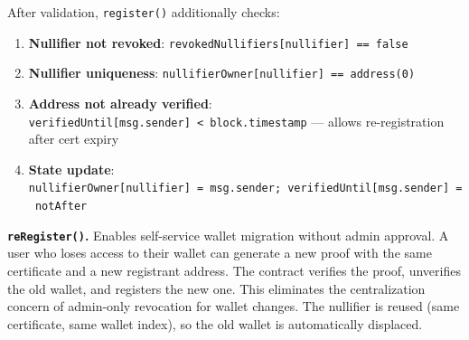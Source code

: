 \documentclass[11pt, a4paper]{article}
\providecommand{\tightlist}{%
  \setlength{\itemsep}{0pt}\setlength{\parskip}{0pt}}
\begin{document}
After validation, \texttt{register()} additionally checks:

\begin{enumerate}
\def\labelenumi{\arabic{enumi}.}
\setcounter{enumi}{9}
\tightlist
\item
  \textbf{Nullifier not revoked}:
  \texttt{revokedNullifiers{[}nullifier{]}\ ==\ false}
\item
  \textbf{Nullifier uniqueness}:
  \texttt{nullifierOwner{[}nullifier{]}\ ==\ address(0)}
\item
  \textbf{Address not already verified}:
  \texttt{verifiedUntil{[}msg.sender{]}\ \textless{}\ block.timestamp}
  --- allows re-registration after cert expiry
\item
  \textbf{State update}:
  \texttt{nullifierOwner{[}nullifier{]}\ =\ msg.sender;\ verifiedUntil{[}msg.sender{]}\ =\ notAfter}
\end{enumerate}

\textbf{\texttt{reRegister()}.} Enables self-service wallet migration
without admin approval. A user who loses access to their wallet can
generate a new proof with the same certificate and a new registrant
address. The contract verifies the proof, unverifies the old wallet, and
registers the new one. This eliminates the centralization concern of
admin-only revocation for wallet changes. The nullifier is reused (same
certificate, same wallet index), so the old wallet is automatically
displaced.
\end{document}
